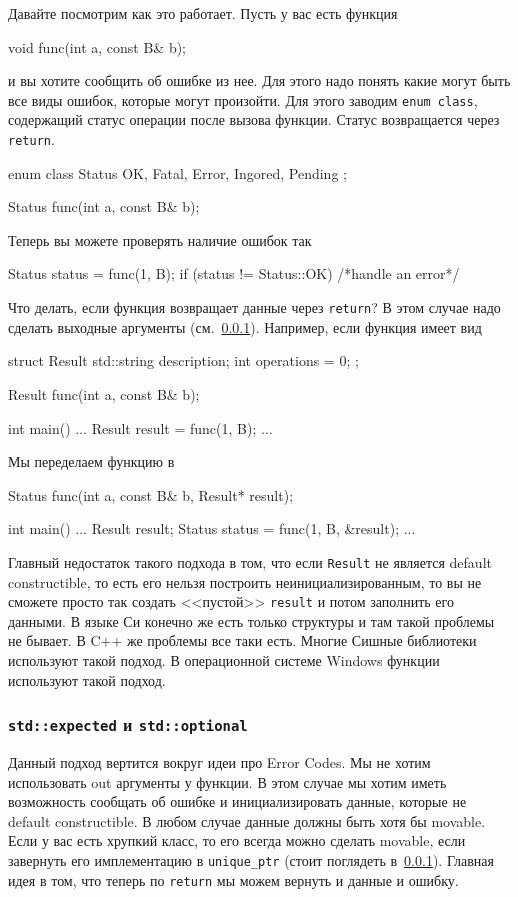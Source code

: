 Давайте посмотрим как это работает.
Пусть у вас есть функция
\begin{cppcode}
void func(int a, const B& b);
\end{cppcode}
и вы хотите сообщить об ошибке из нее.
Для этого надо понять какие могут быть все виды ошибок, которые могут произойти.
Для этого заводим \verb"enum class", содержащий статус операции после вызова функции.
Статус возвращается через \verb"return".
\begin{cppcode}
enum class Status {
  OK, Fatal, Error, Ingored, Pending
};

Status func(int a, const B& b);
\end{cppcode}
Теперь вы можете проверять наличие ошибок так
\begin{cppcode}
Status status = func(1, B{});
if (status != Status::OK) {
  /*handle an error*/
}
\end{cppcode}
Что делать, если функция возвращает данные через \verb"return"?
В этом случае надо сделать выходные аргументы (см.~\ref{}). %
Например, если функция имеет вид
\begin{cppcode}
struct Result {
  std::string description;
  int operations = 0;
};

Result func(int a, const B& b);

int main() {
  ...
  Result result = func(1, B{});
  ...
}
\end{cppcode}
Мы переделаем функцию в
\begin{cppcode}
Status func(int a, const B& b, Result* result);

int main() {
  ...
  Result result;
  Status status = func(1, B{}, &result);
  ...
}
\end{cppcode}
Главный недостаток такого подхода в том, что если \verb"Result" не является default constructible, то есть его нельзя построить неинициализированным, то вы не сможете просто так создать <<пустой>> \verb"result" и потом заполнить его данными.
В языке Си конечно же есть только структуры и там такой проблемы не бывает.
В C++ же проблемы все таки есть.
Многие Сишные библиотеки используют такой подход.
В операционной системе Windows функции используют такой подход.

\subsubsection{\texttt{std::expected} и \texttt{std::optional}}

Данный подход вертится вокруг идеи про Error Codes.
Мы не хотим использовать out аргументы у функции.
В этом случае мы хотим иметь возможность сообщать об ошибке и инициализировать данные, которые не default constructible.
В любом случае данные должны быть хотя бы movable.
Если у вас есть хрупкий класс, то его всегда можно сделать movable, если завернуть его имплементацию в \verb"unique_ptr" (стоит поглядеть в~\ref{}). %
Главная идея в том, что теперь по \verb"return" мы можем вернуть и данные и ошибку.

